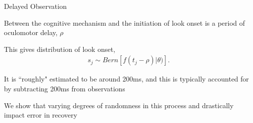 \documentclass{beamer}
\DeclareMathOperator*{\argmin}{arg\!\min}
\newcommand{\vp}{\vspace{2mm}}
\providecommand{\cn}[1]{\textcolor{blue}{#1}}
\begin{document}
%
%
%
%


\begin{frame}{Delayed Observation}\large

Between the cognitive mechanism and the initiation of look onset is a period of oculomotor delay, $\rho$ \vspace{4mm}

This gives distribution of look onset,
\vspace{-1mm}
\begin{align*}
s_j \sim Bern \left[f(t_j - \rho) | \theta)\right].
\end{align*}

It is ``roughly" estimated to be around 200ms, and this is typically accounted for by subtracting 200ms from observations \vspace{4mm}



We show that varying degrees of randomness in this process and drastically impact error in recovery

\end{frame}
%
%
%
%
%
%
\end{document}
